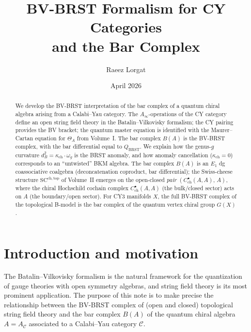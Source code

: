 \documentclass[11pt]{amsart}
\title{BV-BRST Formalism for CY Categories\\and the Bar Complex}
\author{Raeez Lorgat}
\date{April 2026}
\theoremstyle{plain}
\theoremstyle{definition}
\theoremstyle{remark}
\newcommand{\Ainf}{A_\infty}
\newcommand{\BRST}{\mathrm{BRST}}
\newcommand{\SC}{\mathrm{SC}}
\newcommand{\cC}{\mathcal{C}}
\begin{document}
\begin{abstract}
We develop the BV-BRST interpretation of the bar complex of a quantum chiral algebra arising from a Calabi--Yau category. The $\Ainf$-operations of the CY category define an open string field theory in the Batalin--Vilkovisky formalism; the CY pairing provides the BV bracket; the quantum master equation is identified with the Maurer--Cartan equation for $\Theta_A$ from Volume~I. The bar complex $B(A)$ is the BV-BRST complex, with the bar differential equal to $Q_{\BRST}$. We explain how the genus-$g$ curvature $d_B^2 = \kappa_{\mathrm{ch}} \cdot \omega_g$ is the BRST anomaly, and how anomaly cancellation ($\kappa_{\mathrm{ch}} = 0$) corresponds to an ``untwisted'' BKM algebra. The bar complex $B(A)$ is an $E_1$ dg coassociative coalgebra (deconcatenation coproduct, bar differential); the Swiss-cheese structure $\SC^{\mathrm{ch,top}}$ of Volume~II emerges on the open-closed \emph{pair} $(C^\bullet_{\mathrm{ch}}(A,A),\, A)$, where the chiral Hochschild cochain complex $C^\bullet_{\mathrm{ch}}(A,A)$ (the bulk/closed sector) acts on $A$ (the boundary/open sector). For CY3 manifolds $X$, the full BV-BRST complex of the topological B-model is the bar complex of the quantum vertex chiral group $G(X)$.
\end{abstract}

\maketitle
\tableofcontents

\section{Introduction and motivation}
\label{sec:introduction}

The Batalin--Vilkovisky formalism is the natural framework for the quantization of gauge theories with open symmetry algebras, and string field theory is its most prominent application. The purpose of this note is to make precise the relationship between the BV-BRST complex of (open and closed) topological string field theory and the bar complex $B(A)$ of the quantum chiral algebra $A = A_\cC$ associated to a Calabi--Yau category $\cC$.
\end{document}
